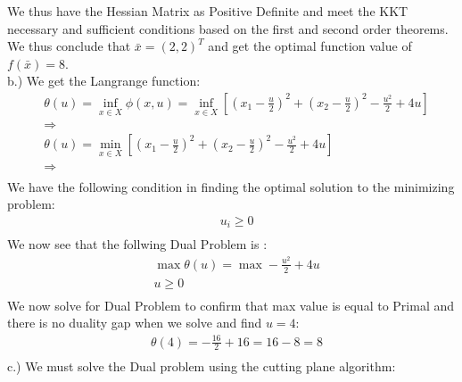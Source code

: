 \documentclass[12pt]{article}
\begin{document}
    We thus have the Hessian Matrix as Positive Definite and meet the KKT necessary and sufficient conditions based on the first and second order theorems. We thus conclude that $\bar x = (2,2)^T $ and get the optimal function value of $f(\bar x) = 8$. \\
    b.) We get the Langrange function: 
    \begin{align*}
        & \theta (u) = \inf_{x \in X} \phi (x,u) = \inf_{x \in X} [(x_1 - \frac{u}{2})^2 + (x_2 - \frac{u}{2})^2 - \frac{u^2}{2} + 4u]\\
        &\Rightarrow\\
        &\theta (u) = \min_{x \in X} [(x_1 - \frac{u}{2})^2 + (x_2 - \frac{u}{2})^2 - \frac{u^2}{2} + 4u]\\
        &\Rightarrow\\
    \end{align*}
    We have the following condition in finding the optimal solution to the minimizing problem:\\
        \begin{align*}
            &u_i \geq 0\\
        \end{align*}
    We now see that the follwing Dual Problem is : \\
        \begin{align*}
            & \max \theta (u) = \max - \frac{u^2}{2} + 4u\\
            &u \geq 0\\
        \end{align*}
    We now solve for Dual Problem to confirm that max value is equal to Primal and there is no duality gap when we solve and find $u = 4$: \\ 
        \begin{align*}
            &\theta(4) = -\frac{16}{2} + 16 = 16 - 8 = 8 \\
        \end{align*}
    c.) We must solve the Dual problem using the cutting plane algorithm:\\
    
\end{document}
